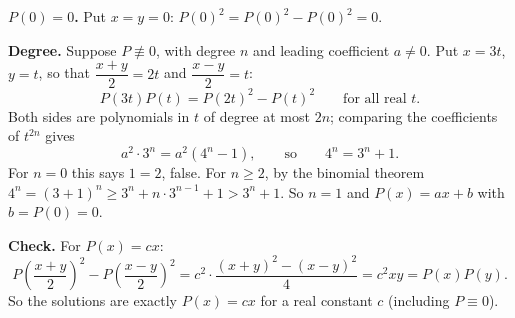 \textbf{$P(0)=0$.} Put $x=y=0$: $P(0)^2=P(0)^2-P(0)^2=0$.

\textbf{Degree.} Suppose $P\not\equiv0$, with degree $n$ and leading coefficient $a\ne0$. Put $x=3t$, $y=t$, so that $\dfrac{x+y}{2}=2t$ and $\dfrac{x-y}{2}=t$:
\[P(3t)P(t)=P(2t)^2-P(t)^2\qquad\text{for all real }t.\]
Both sides are polynomials in $t$ of degree at most $2n$; comparing the coefficients of $t^{2n}$ gives
\[a^2\cdot3^n=a^2\left(4^n-1\right),\qquad\text{so}\qquad 4^n=3^n+1.\]
For $n=0$ this says $1=2$, false. For $n\ge2$, by the binomial theorem $4^n=(3+1)^n\ge3^n+n\cdot3^{n-1}+1>3^n+1$. So $n=1$ and $P(x)=ax+b$ with $b=P(0)=0$.

\textbf{Check.} For $P(x)=cx$:
\[P\left(\dfrac{x+y}{2}\right)^2-P\left(\dfrac{x-y}{2}\right)^2=c^2\cdot\dfrac{(x+y)^2-(x-y)^2}{4}=c^2xy=P(x)P(y).\]
So the solutions are exactly $\boxed{P(x)=cx}$ for a real constant $c$ (including $P\equiv0$).
